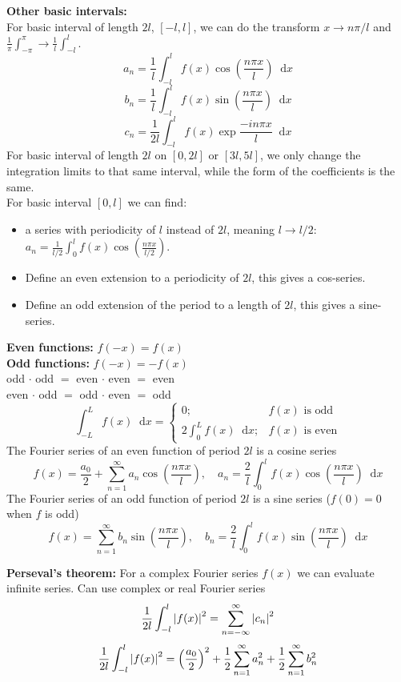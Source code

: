 \documentclass[a4paper, 10pt]{article}
\newcommand*\diff{\mathop{}\!\mathrm{d}}
\begin{document}
\begin{multicols*}{3}
\textbf{Other basic intervals:}\\
For basic interval of length $2l$, $[-l, l]$, we can do the transform $x\rightarrow n\pi/l$ and $\frac{1}{\pi}\int_{-\pi}^\pi \rightarrow \frac{1}{l}\int_{-l}^l$.
$$ a_n = \frac{1}{l}\int_{-l}^l f(x) \cos{\left(\frac{n\pi x}{l}\right)} \diff x$$
$$ b_n = \frac{1}{l}\int_{-l}^l f(x) \sin{\left(\frac{n\pi x}{l}\right)} \diff x$$
$$ c_n = \frac{1}{2l}\int_{-l}^l f(x) \exp{\frac{-in\pi x}{l}} \diff x$$
For basic interval of length $2l$ on $[0, 2l]$ or $[3l, 5l]$, we only change the integration limits to that same interval, while the form of the coefficients is the same.\\
For basic interval $[0, l]$ we can find:
\begin{itemize}
  \item a series with periodicity of $l$ instead of $2l$, meaning $l\rightarrow l/2$: $a_n = \frac{1}{l/2}\int_0^l f(x)\cos{\left( \frac{n\pi x}{l/2} \right)}$.
  \item Define an even extension to a periodicity of $2l$, this gives a cos-series.
  \item Define an odd extension of the period to a length of $2l$, this gives a sine-series.
\end{itemize}
\textbf{Even functions:} $f(-x)=f(x)$\\
\textbf{Odd  functions:} $f(-x)=-f(x)$\\
odd $\cdot$ odd $=$ even $\cdot$ even $=$ even\\
even $\cdot$ odd $=$ odd $\cdot$ even $=$ odd
\begin{equation*} \int_{-L}^{L}f(x) \diff x = \begin{cases}
0; & f(x) \text{ is odd} \\
2\int_0^L f(x) \diff x; & f(x) \text{ is even}
\end{cases} \end{equation*}
The Fourier series of an even function of period $2l$ is a cosine series
$$f(x)= \frac{a_0}{2} + \sum_{n=1}^{\infty} a_n \cos{\left( \frac{n\pi x}{l} \right)},\quad a_n = \frac{2}{l}\int_0^lf(x)\cos{\left( \frac{n\pi x}{l} \right)}\diff x $$
The Fourier series of an odd function of period $2l$ is a sine series ($f(0)=0$ when $f$ is odd)
$$f(x)= \sum_{n=1}^{\infty} b_n \sin{\left( \frac{n\pi x}{l} \right)},\quad b_n = \frac{2}{l}\int_0^lf(x)\sin{\left( \frac{n\pi x}{l} \right)}\diff x $$

\textbf{Perseval's theorem:}
For a complex Fourier series $f(x)$ we can evaluate infinite series. Can use complex or real Fourier series
$$ \frac{1}{2l}\int_{-l}^{l} \abs{f(x)}^2 = \sum_{n=-\infty}^{\infty} \abs{c_n}^2$$
$$ \frac{1}{2l}\int_{-l}^{l} \abs{f(x)}^2 = \left(\frac{a_0}{2}\right)^2 + \frac{1}{2}\sum_{n=1}^{\infty} a_n^2 + \frac{1}{2}\sum_{n=1}^{\infty} b_n^2$$

\end{multicols*}
\end{document}
